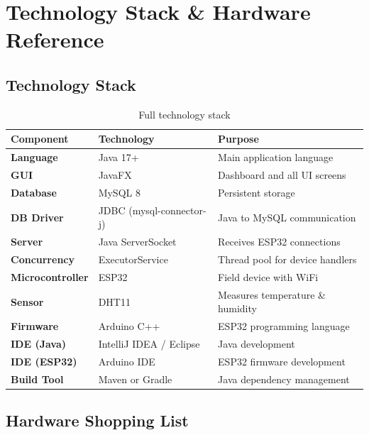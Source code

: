 \documentclass[12pt, a4paper]{report}
\begin{document}
\chapter{Technology Stack \& Hardware Reference}

\section{Technology Stack}

\begin{table}[H]
\centering
\renewcommand{\arraystretch}{1.6}
\begin{tabularx}{\textwidth}{>{\bfseries}l l X}
\toprule
\textbf{Component} & \textbf{Technology} & \textbf{Purpose} \\
\midrule
Language         & Java 17+            & Main application language \\
GUI              & JavaFX              & Dashboard and all UI screens \\
Database         & MySQL 8             & Persistent storage \\
DB Driver        & JDBC (mysql-connector-j) & Java to MySQL communication \\
Server           & Java ServerSocket   & Receives ESP32 connections \\
Concurrency      & ExecutorService     & Thread pool for device handlers \\
Microcontroller  & ESP32               & Field device with WiFi \\
Sensor           & DHT11               & Measures temperature \& humidity \\
Firmware         & Arduino C++         & ESP32 programming language \\
IDE (Java)       & IntelliJ IDEA / Eclipse & Java development \\
IDE (ESP32)      & Arduino IDE         & ESP32 firmware development \\
Build Tool       & Maven or Gradle     & Java dependency management \\
\bottomrule
\end{tabularx}
\caption{Full technology stack}
\end{table}

\section{Hardware Shopping List}
\end{document}
